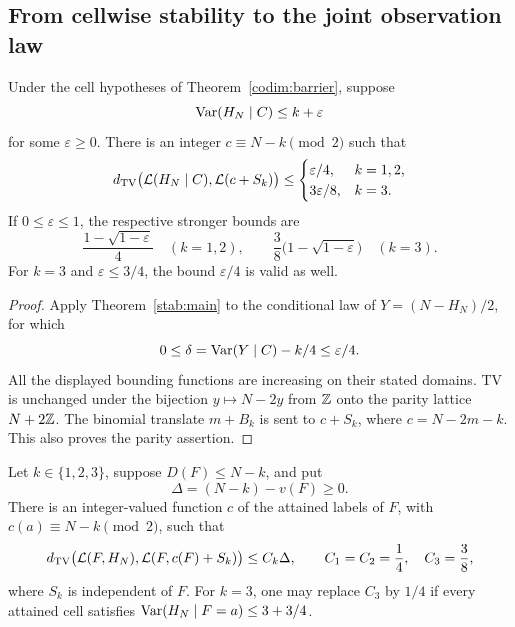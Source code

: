 \subsection{From cellwise stability to the joint observation law}

\begin{corollary}
\label{stab:cell}
Under the cell hypotheses of Theorem~\ref{codim:barrier}, suppose
\[
\operatorname{Var}(H_N\mid C)\le k+\varepsilon
\]
for some \(\varepsilon\ge0\).
There is an integer \(c\equiv N-k\pmod2\) such that
\[
d_{\mathrm{TV}}\bigl(\mathcal L(H_N\mid C),\mathcal L(c+S_k)\bigr)
\le
\begin{cases}
\varepsilon/4,&k=1,2,\\
3\varepsilon/8,&k=3.
\end{cases}
\]
If \(0\le\varepsilon\le1\), the respective stronger bounds are
\[
\frac{1-\sqrt{1-\varepsilon}}4
\quad(k=1,2),
\qquad
\frac38\bigl(1-\sqrt{1-\varepsilon}\bigr)
\quad(k=3).
\]
For \(k=3\) and \(\varepsilon\le3/4\), the bound
\(\varepsilon/4\) is valid as well.
\end{corollary}

\begin{proof}
Apply Theorem~\ref{stab:main} to the conditional law of
\(Y=(N-H_N)/2\), for which
\[
0\le\delta=\operatorname{Var}(Y\mid C)-k/4\le\varepsilon/4.
\]
All the displayed bounding functions are increasing on their stated
domains.  TV is unchanged under the bijection \(y\mapsto N-2y\)
from \(\mathbb Z\) onto the parity lattice \(N+2\mathbb Z\).
The binomial translate \(m+B_k\) is sent to
\(c+S_k\), where \(c=N-2m-k\).  This also proves the parity
assertion.
\end{proof}

\begin{corollary}
\label{stab:joint}
Let \(k\in\{1,2,3\}\), suppose \(D(F)\le N-k\), and put
\[
\Delta=(N-k)-v(F)\ge0.
\]
There is an integer-valued function \(c\) of the attained labels of
\(F\), with \(c(a)\equiv N-k\pmod2\), such that
\begin{equation}
\label{stab:joint-bound}
d_{\mathrm{TV}}\bigl(\mathcal L(F,H_N),\mathcal L(F,c(F)+S_k)\bigr)
\le C_k\Delta,
\qquad
C_1=C_2=\frac14,\quad C_3=\frac38,
\end{equation}
where \(S_k\) is independent of \(F\).
For \(k=3\), one may replace \(C_3\) by \(1/4\) if every attained
cell satisfies
\(\operatorname{Var}(H_N\mid F=a)\le3+3/4\).
\end{corollary}

